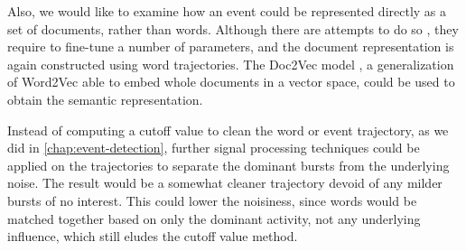 Also, we would like to examine how an event could be represented directly as a set of documents, rather than words. Although there are attempts to do so \citep{document-bursty-representation}, they require to fine-tune a number of parameters, and the document representation is again constructed using word trajectories. The Doc2Vec model \citep{doc2vec}, a generalization of Word2Vec able to embed whole documents in a vector space, could be used to obtain the semantic representation.

Instead of computing a cutoff value to clean the word or event trajectory, as we did in \autoref{chap:event-detection}, further signal processing techniques could be applied on the trajectories to separate the dominant bursts from the underlying noise. The result would be a somewhat cleaner trajectory devoid of any milder bursts of no interest. This could lower the noisiness, since words would be matched together based on only the dominant activity, not any underlying influence, which still eludes the cutoff value method.